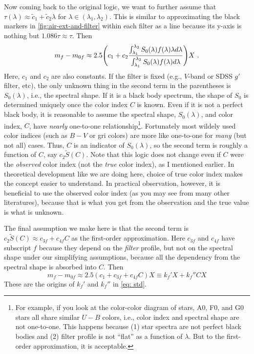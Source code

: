 Now coming back to the original logic, we want to further assume that $ \tau(\lambda) \approx \tilde{c}_1 + \tilde{c}_2 \lambda $ for $ \lambda \in (\lambda_1, \lambda_2) $. This is similar to approximating the black markers in \cref{fig:air-ext-and-filter} within each filter as a line because its y-axis is nothing but $ 1.086 \tau \approx \tau $. Then
\begin{equation}
  m_f - m_{0f} 
    \approx 2.5 
    \qty (c_1 + c_2\frac{\int_{\lambda_1}^{\lambda_2} S_0(\lambda) f(\lambda) \lambda d\lambda}
      {\int_{\lambda_1}^{\lambda_2} S_0(\lambda) f(\lambda) d\lambda} ) X ~.
\end{equation}
Here, $ c_1 $ and $ c_2 $ are also constants. If the filter is fixed (e.g., $ V $-band or SDSS $ g' $ filter, etc), the only unknown thing in the second term in the parentheses is $ S_0(\lambda) $, i.e., the spectral shape. If it is a black body spectrum, the shape of $ S_0 $ is determined uniquely once the color index $ C $ is known. Even if it is not a perfect black body, it is reasonable to assume the spectral shape, $ S_0(\lambda) $, and color index, $ C $, have \textit{nearly} one-to-one relationship\footnote{For example, if you look at the color-color diagram of stars, A0, F0, and G0 stars all share similar $ U - B $ colors, i.e., color index and spectral shape are not one-to-one. This happens because (1) star spectra are not perfect black bodies and (2) filter profile is not ``flat'' as a function of $ \lambda $. But to the first-order approximation, it is acceptable.}. Fortunately most wildely used color indices (such as $ B - V $ or gri colors) are more like one-to-one for \emph{many} (but not all) cases. Thus, $ C $ is an indicator of $ S_0(\lambda) $, so the second term is roughly a function of $ C $, say $ c_2 \tilde{S}(C) $. Note that this logic does not change even if $ C $ were the \textit{observed} color index (not the \textit{true} color index), as I mentioned earlier. In theoretical development like we are doing here, choice of true color index makes the concept easier to understand. In practical observation, however, it is beneficial to use the observed color index (as you may see from many other literatures), because that is what you get from the observation and the true value is what is unknown.

The final assumption we make here is that the second term is $ c_2 \tilde{S} (C) \approx c_{3f} + c_{4f} C $ as the first-order approximation. Here $ c_{3f} $ and $ c_{4f} $ have subscript $ f $ because they depend on the \textit{filter} profile, but not on the spectral shape under our simplifying assumptions, because all the dependency from the spectral shape is absorbed into $ C $. Then
\begin{equation}
  m_f - m_{0f} 
  \approx 2.5 (c_1 + c_{3f} + c_{4f} C) X 
  \equiv k_f' X + k_f'' CX
\end{equation}
 These are the origins of $ k_f' $ and $ k_f'' $ in \cref{eq: std}.

